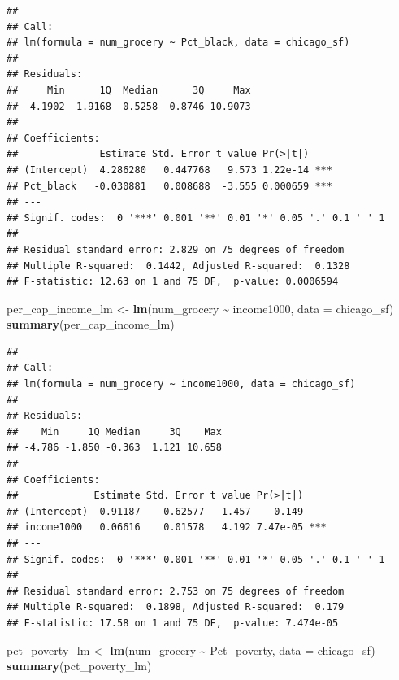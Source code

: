 \documentclass[
]{article}
\newenvironment{Shaded}{\begin{snugshade}}{\end{snugshade}}
\newcommand{\AttributeTok}[1]{\textcolor[rgb]{0.13,0.29,0.53}{#1}}
\newcommand{\FunctionTok}[1]{\textcolor[rgb]{0.13,0.29,0.53}{\textbf{#1}}}
\newcommand{\NormalTok}[1]{#1}
\newcommand{\OtherTok}[1]{\textcolor[rgb]{0.56,0.35,0.01}{#1}}
\newcommand{\SpecialCharTok}[1]{\textcolor[rgb]{0.81,0.36,0.00}{\textbf{#1}}}
\begin{document}
\begin{verbatim}
## 
## Call:
## lm(formula = num_grocery ~ Pct_black, data = chicago_sf)
## 
## Residuals:
##     Min      1Q  Median      3Q     Max 
## -4.1902 -1.9168 -0.5258  0.8746 10.9073 
## 
## Coefficients:
##              Estimate Std. Error t value Pr(>|t|)    
## (Intercept)  4.286280   0.447768   9.573 1.22e-14 ***
## Pct_black   -0.030881   0.008688  -3.555 0.000659 ***
## ---
## Signif. codes:  0 '***' 0.001 '**' 0.01 '*' 0.05 '.' 0.1 ' ' 1
## 
## Residual standard error: 2.829 on 75 degrees of freedom
## Multiple R-squared:  0.1442, Adjusted R-squared:  0.1328 
## F-statistic: 12.63 on 1 and 75 DF,  p-value: 0.0006594
\end{verbatim}

\begin{Shaded}
\begin{Highlighting}[]
\NormalTok{per\_cap\_income\_lm }\OtherTok{\textless{}{-}} \FunctionTok{lm}\NormalTok{(num\_grocery }\SpecialCharTok{\textasciitilde{}}\NormalTok{ income1000, }\AttributeTok{data =}\NormalTok{ chicago\_sf)}
\FunctionTok{summary}\NormalTok{(per\_cap\_income\_lm)}
\end{Highlighting}
\end{Shaded}

\begin{verbatim}
## 
## Call:
## lm(formula = num_grocery ~ income1000, data = chicago_sf)
## 
## Residuals:
##    Min     1Q Median     3Q    Max 
## -4.786 -1.850 -0.363  1.121 10.658 
## 
## Coefficients:
##             Estimate Std. Error t value Pr(>|t|)    
## (Intercept)  0.91187    0.62577   1.457    0.149    
## income1000   0.06616    0.01578   4.192 7.47e-05 ***
## ---
## Signif. codes:  0 '***' 0.001 '**' 0.01 '*' 0.05 '.' 0.1 ' ' 1
## 
## Residual standard error: 2.753 on 75 degrees of freedom
## Multiple R-squared:  0.1898, Adjusted R-squared:  0.179 
## F-statistic: 17.58 on 1 and 75 DF,  p-value: 7.474e-05
\end{verbatim}

\begin{Shaded}
\begin{Highlighting}[]
\NormalTok{pct\_poverty\_lm }\OtherTok{\textless{}{-}} \FunctionTok{lm}\NormalTok{(num\_grocery }\SpecialCharTok{\textasciitilde{}}\NormalTok{ Pct\_poverty, }\AttributeTok{data =}\NormalTok{ chicago\_sf)}
\FunctionTok{summary}\NormalTok{(pct\_poverty\_lm)}
\end{Highlighting}
\end{Shaded}
\end{document}
